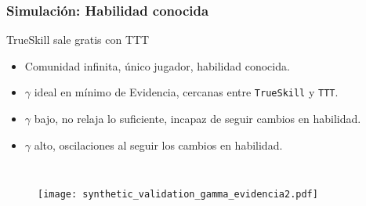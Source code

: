 \documentclass{beamer}
\begin{document}
\begin{frame}
\frametitle{Simulaci\'on: Habilidad conocida}
TrueSkill sale gratis con TTT
\begin{itemize}
 \vspace{-0.2cm}\item Comunidad infinita, \'unico jugador, habilidad conocida.
 \vspace{-0.2cm}\item $\gamma$ ideal en m\'inimo de Evidencia, cercanas entre \texttt{TrueSkill} y \texttt{TTT}.
 \vspace{-0.2cm}\item $\gamma$ bajo, no relaja lo suficiente, incapaz de seguir cambios en habilidad.
  \vspace{-0.2cm}\item $\gamma$ alto, oscilaciones al seguir los cambios en habilidad.
\end{itemize}
\begin{columns}

  \begin{figure}[H]
	\centering
	\texttt{[image: synthetic\_validation\_gamma\_evidencia2.pdf]}
\end{figure}
 
\end{columns}


\end{frame}

\end{document}
